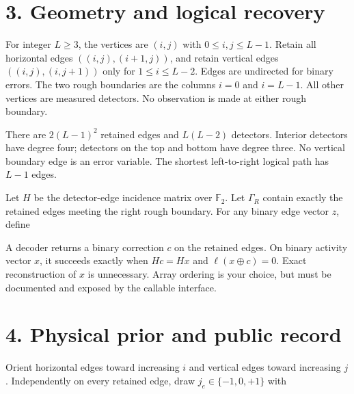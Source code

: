 \documentclass[11pt,letterpaper]{article}
\newcommand{\displayfit}[1]{\sbox{\mathbox}{$\displaystyle #1$}\ifdim\wd\mathbox>\linewidth\resizebox{\linewidth}{!}{\usebox{\mathbox}}\else\usebox{\mathbox}\fi}
\begin{document}
\section*{3. Geometry and logical recovery}

For integer $L\geq3$, the vertices are $(i,j)$ with $0\leq i,j\leq L-1$. Retain all horizontal edges $((i,j),(i+1,j))$, and retain vertical edges $((i,j),(i,j+1))$ only for $1\leq i\leq L-2$. Edges are undirected for binary errors. The two rough boundaries are the columns $i=0$ and $i=L-1$. All other vertices are measured detectors. No observation is made at either rough boundary.\par

There are $2(L-1)^2$ retained edges and $L(L-2)$ detectors. Interior detectors have degree four; detectors on the top and bottom have degree three. No vertical boundary edge is an error variable. The shortest left-to-right logical path has $L-1$ edges.\par

Let $H$ be the detector-edge incidence matrix over $\mathbb F_2$. Let $\Gamma_R$ contain exactly the retained edges meeting the right rough boundary. For any binary edge vector $z$, define\par

\begin{center}\displayfit{\ell(z)=\bigoplus_{e\in\Gamma_R} z_e.}\end{center}

A decoder returns a binary correction $c$ on the retained edges. On binary activity vector $x$, it succeeds exactly when $Hc=Hx$ and $\ell(x\oplus c)=0$. Exact reconstruction of $x$ is unnecessary. Array ordering is your choice, but must be documented and exposed by the callable interface.\par

\section*{4. Physical prior and public record}

Orient horizontal edges toward increasing $i$ and vertical edges toward increasing $j$. Independently on every retained edge, draw $j_e\in\{-1,0,+1\}$ with\par

\begin{center}\displayfit{\Pr(j_e=0)=1-p,\qquad \Pr(j_e=\pm1)=\frac{p e^{\pm h}}{2\cosh h}.}\end{center}
\end{document}
